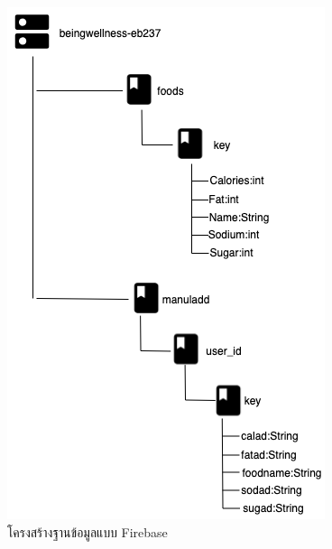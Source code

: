 	\begin{figure}[H]
	\centering
	\includegraphics[width=0.7\columnwidth]
	{Figures/3/DB/firebase.png}
	\caption{โครงสร้างฐานข้อมูลแบบ Firebase}
	\label{Fig:DB1}
	\end{figure}

